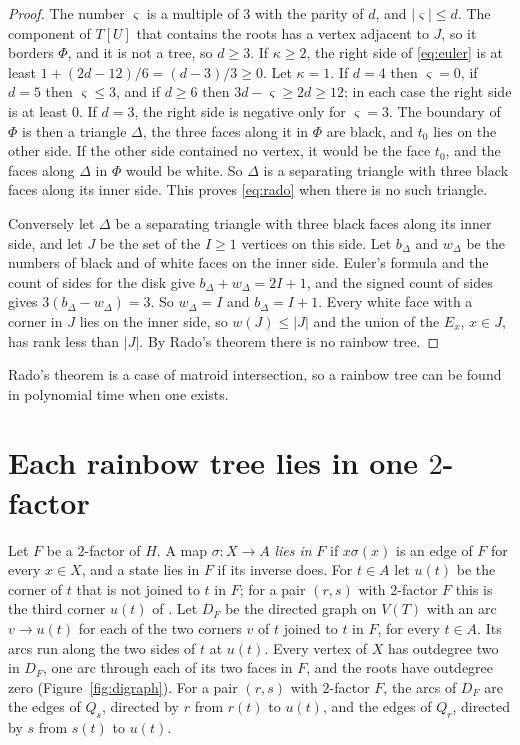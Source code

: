 \documentclass[10pt]{amsart}
\numberwithin{equation}{section}
\theoremstyle{definition}
\theoremstyle{remark}
\begin{document}
\begin{proof}
The number $\varsigma$ is a multiple of $3$ with the parity of $d$, and $|\varsigma|\le d$.
The component of $T[U]$ that contains the roots has a vertex adjacent to $J$, so it borders $\Phi$, and it is not a tree, so $d\ge3$.
If $\kappa\ge2$, the right side of \eqref{eq:euler} is at least $1+(2d-12)/6=(d-3)/3\ge0$.
Let $\kappa=1$.
If $d=4$ then $\varsigma=0$, if $d=5$ then $\varsigma\le3$, and if $d\ge6$ then $3d-\varsigma\ge2d\ge12$; in each case the right side is at least $0$.
If $d=3$, the right side is negative only for $\varsigma=3$.
The boundary of $\Phi$ is then a triangle $\Delta$, the three faces along it in $\Phi$ are black, and $t_0$ lies on the other side.
If the other side contained no vertex, it would be the face $t_0$, and the faces along $\Delta$ in $\Phi$ would be white.
So $\Delta$ is a separating triangle with three black faces along its inner side.
This proves \eqref{eq:rado} when there is no such triangle.

Conversely let $\Delta$ be a separating triangle with three black faces along its inner side, and let $J$ be the set of the $I\ge1$ vertices on this side.
Let $b_\Delta$ and $w_\Delta$ be the numbers of black and of white faces on the inner side.
Euler's formula and the count of sides for the disk give $b_\Delta+w_\Delta=2I+1$, and the signed count of sides gives $3(b_\Delta-w_\Delta)=3$.
So $w_\Delta=I$ and $b_\Delta=I+1$.
Every white face with a corner in $J$ lies on the inner side, so $w(J)\le|J|$ and the union of the $E_x$, $x\in J$, has rank less than $|J|$.
By Rado's theorem there is no rainbow tree.
\end{proof}

Rado's theorem is a case of matroid intersection, so a rainbow tree can be found in polynomial time when one exists.

\section{Each rainbow tree lies in one \texorpdfstring{$2$}{2}-factor}\label{sec:S}

Let $F$ be a $2$-factor of $H$.
A map $\sigma\colon X\to A$ \emph{lies in} $F$ if $x\sigma(x)$ is an edge of $F$ for every $x\in X$, and a state lies in $F$ if its inverse does.
For $t\in A$ let $u(t)$ be the corner of $t$ that is not joined to $t$ in $F$; for a pair $(r,s)$ with $2$-factor $F$ this is the third corner $u(t)$ of \cite[Section~4]{Paper}.
Let $D_F$ be the directed graph on $V(T)$ with an arc $v\to u(t)$ for each of the two corners $v$ of $t$ joined to $t$ in $F$, for every $t\in A$.
Its arcs run along the two sides of $t$ at $u(t)$.
Every vertex of $X$ has outdegree two in $D_F$, one arc through each of its two faces in $F$, and the roots have outdegree zero (Figure~\ref{fig:digraph}).
For a pair $(r,s)$ with $2$-factor $F$, the arcs of $D_F$ are the edges of $Q_s$, directed by $r$ from $r(t)$ to $u(t)$, and the edges of $Q_r$, directed by $s$ from $s(t)$ to $u(t)$.
\end{document}
